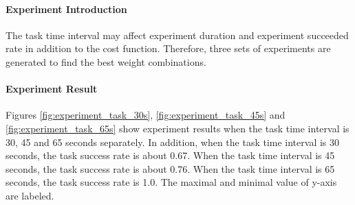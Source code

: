 \paragraph{Experiment Introduction}
The task time interval may affect experiment duration and experiment succeeded rate in addition to the cost function. Therefore, three sets of experiments are generated to find the best weight combinations. 

\paragraph{Experiment Result} 
Figures \ref{fig:experiment_task_30s}, \ref{fig:experiment_task_45s} and \ref{fig:experiment_task_65s} show experiment results when the task time interval is 30, 45 and 65 seconds separately. 
In addition, when the task time interval is 30 seconds, the task success rate is about 0.67. When the task time interval is 45 seconds, the task success rate is about 0.76. 
When the task time interval is 65 seconds, the task success rate is 1.0. The maximal and minimal value of y-axis are labeled.
